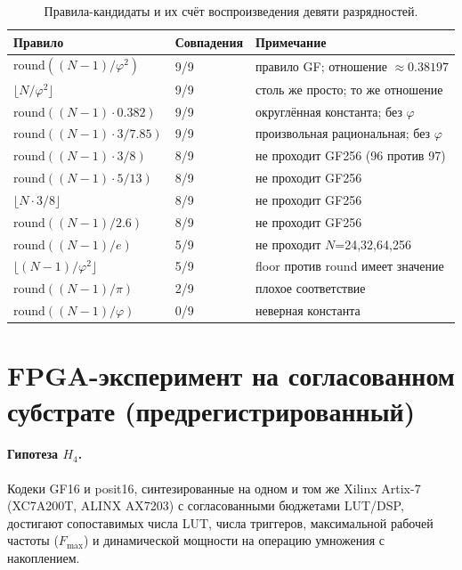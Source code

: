 \documentclass[11pt,a4paper]{article}
\theoremstyle{plain}
\begin{document}
\begin{table}[h]
\centering
\caption{Правила-кандидаты и их счёт воспроизведения девяти разрядностей.}
\label{tab:lookelsewhere}
\begin{tabular}{lll}
\toprule
Правило & Совпадения & Примечание \\
\midrule
$\mathrm{round}((N-1)/\varphi^{2})$ & 9/9 & правило GF; отношение $\approx 0.38197$ \\
$\lfloor N/\varphi^{2} \rfloor$     & 9/9 & столь же просто; то же отношение \\
$\mathrm{round}((N-1) \cdot 0.382)$ & 9/9 & округлённая константа; без $\varphi$ \\
$\mathrm{round}((N-1) \cdot 3/7.85)$ & 9/9 & произвольная рациональная; без $\varphi$ \\
$\mathrm{round}((N-1) \cdot 3/8)$    & 8/9 & не проходит GF256 (96 против 97) \\
$\mathrm{round}((N-1) \cdot 5/13)$   & 8/9 & не проходит GF256 \\
$\lfloor N \cdot 3/8 \rfloor$        & 8/9 & не проходит GF256 \\
$\mathrm{round}((N-1)/2.6)$          & 8/9 & не проходит GF256 \\
$\mathrm{round}((N-1)/e)$            & 5/9 & не проходит $N$=24,32,64,256 \\
$\lfloor (N-1)/\varphi^{2} \rfloor$  & 5/9 & floor против round имеет значение \\
$\mathrm{round}((N-1)/\pi)$          & 2/9 & плохое соответствие \\
$\mathrm{round}((N-1)/\varphi)$      & 0/9 & неверная константа \\
\bottomrule
\end{tabular}
\end{table}

\section{FPGA-эксперимент на согласованном субстрате (предрегистрированный)}\label{app:fpga}

\paragraph{Гипотеза $H_4$.}
Кодеки GF16 и posit16, синтезированные на одном и том же Xilinx Artix-7
(XC7A200T, ALINX AX7203) с согласованными бюджетами LUT/DSP,
достигают сопоставимых числа LUT, числа триггеров, максимальной рабочей частоты
(\(F_{\max}\)) и динамической мощности на операцию умножения с накоплением.
\end{document}
